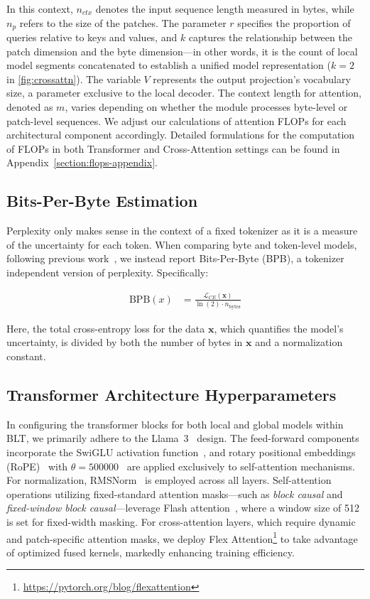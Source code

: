 In this context, $n_{ctx}$ denotes the input sequence length measured in bytes, while $n_p$ refers to the size of the patches. The parameter $r$ specifies the proportion of queries relative to keys and values, and $k$ captures the relationship between the patch dimension and the byte dimension—in other words, it is the count of local model segments concatenated to establish a unified model representation ($k=2$ in \autoref{fig:crossattn}). The variable $V$ represents the output projection’s vocabulary size, a parameter exclusive to the local decoder. The context length for attention, denoted as $m$, varies depending on whether the module processes byte-level or patch-level sequences. We adjust our calculations of attention FLOPs for each architectural component accordingly. Detailed formulations for the computation of FLOPs in both Transformer and Cross-Attention settings can be found in Appendix~\ref{section:flops-appendix}.

\subsection{Bits-Per-Byte Estimation} Perplexity only makes sense in the context of a fixed tokenizer as it is a measure of the uncertainty for each token. When comparing byte and token-level models, following previous work~\citep{xue2022byt5, yu2023megabyte, wang2024mambabyte}, we instead report Bits-Per-Byte (BPB), a tokenizer independent version of perplexity. Specifically:

\begin{align}
    \text{BPB}(x)&= \frac{\mathcal{L}_{CE}(\pmb{x})}{\ln(2)\cdot n_{\text{bytes}}}
\end{align}

Here, the total cross-entropy loss for the data $\pmb{x}$, which quantifies the model's uncertainty, is divided by both the number of bytes in $\pmb{x}$ and a normalization constant.

\subsection{Transformer Architecture Hyperparameters} In configuring the transformer blocks for both local and global models within {\textsc BLT}, we primarily adhere to the Llama~3~\citep{dubey2024llama} design. The feed-forward components incorporate the SwiGLU activation function~\citep{swiglu}, and rotary positional embeddings (RoPE)~\citep{RoPe} with $\theta=500000$~\citep{xiong2024effective} are applied exclusively to self-attention mechanisms. For normalization, RMSNorm~\citep{RMSNorm} is employed across all layers. Self-attention operations utilizing fixed-standard attention masks—such as \textit{block causal} and \textit{fixed-window block causal}—leverage Flash attention~\citep{dao2022flashattention}, where a window size of 512 is set for fixed-width masking. For cross-attention layers, which require dynamic and patch-specific attention masks, we deploy Flex Attention\footnote{\url{https://pytorch.org/blog/flexattention}} to take advantage of optimized fused kernels, markedly enhancing training efficiency.


